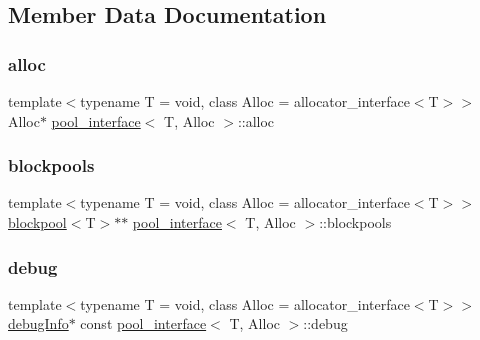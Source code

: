 \subsection{Member Data Documentation}
\mbox{\label{classpool__interface_a920fcaa0f78cd3d45e6d128d18355f67}} 
\subsubsection{\texorpdfstring{alloc}{alloc}}
{\footnotesize\ttfamily template$<$typename T  = void, class Alloc  = allocator\+\_\+interface$<$\+T$>$$>$ \\
Alloc$\ast$ \hyperlink{classpool__interface}{pool\+\_\+interface}$<$ T, Alloc $>$\+::alloc}

\mbox{\label{classpool__interface_a6585092dd9b946516287735834174726}} 
\subsubsection{\texorpdfstring{blockpools}{blockpools}}
{\footnotesize\ttfamily template$<$typename T  = void, class Alloc  = allocator\+\_\+interface$<$\+T$>$$>$ \\
\hyperlink{classblockpool}{blockpool}$<$T$>$$\ast$$\ast$ \hyperlink{classpool__interface}{pool\+\_\+interface}$<$ T, Alloc $>$\+::blockpools}

\mbox{\label{classpool__interface_ab609cb214dbd9228200698e6fd8256fe}} 
\subsubsection{\texorpdfstring{debug}{debug}}
{\footnotesize\ttfamily template$<$typename T  = void, class Alloc  = allocator\+\_\+interface$<$\+T$>$$>$ \\
\hyperlink{classdebugInfo}{debug\+Info}$\ast$ const \hyperlink{classpool__interface}{pool\+\_\+interface}$<$ T, Alloc $>$\+::debug}

\mbox{\label{classpool__interface_a66acd16c6997604702dff95487152570}} 

